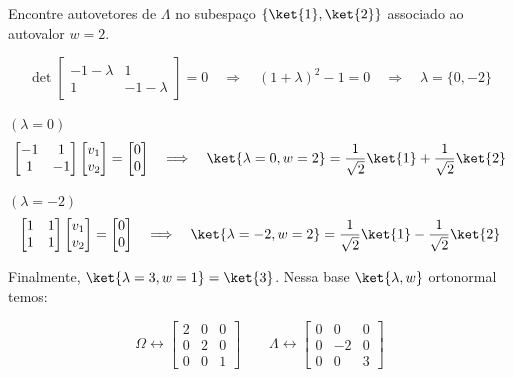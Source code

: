 Encontre autovetores de $\Lambda$ no subespaço $\{\ket{1}, \ket{2}\}$ associado ao autovalor $w=2$.

\begin{equation}
    \det \begin{bmatrix} -1-\lambda & 1 \\ 1 & -1-\lambda \end{bmatrix} = 0
    \quad \Longrightarrow \quad
    (1+\lambda)^2 - 1 = 0
    \quad \Longrightarrow \quad
    \lambda = \{0, -2\}
\end{equation}

$(\lambda = 0)$
\begin{equation}
    \begin{bmatrix} -1 & 1 \\ 1 & -1 \end{bmatrix}
    \begin{bmatrix} v_1 \\ v_2 \end{bmatrix}
    =
    \begin{bmatrix} 0 \\ 0 \end{bmatrix}
    \quad \Longrightarrow \quad
    \ket{\lambda=0, w=2} = \frac{1}{\sqrt{2}}\ket{1} + \frac{1}{\sqrt{2}}\ket{2}
\end{equation}

$(\lambda = -2)$
\begin{equation}
    \begin{bmatrix} 1 & 1 \\ 1 & 1 \end{bmatrix}
    \begin{bmatrix} v_1 \\ v_2 \end{bmatrix}
    =
    \begin{bmatrix} 0 \\ 0 \end{bmatrix}
    \quad \Longrightarrow \quad
    \ket{\lambda=-2, w=2} = \frac{1}{\sqrt{2}}\ket{1} - \frac{1}{\sqrt{2}}\ket{2}
\end{equation}

Finalmente, $\ket{\lambda=3, w=1} = \ket{3}$. Nessa base $\ket{\lambda, w}$ ortonormal temos:

\begin{equation}
    \Omega \leftrightarrow \begin{bmatrix} 2 & 0 & 0 \\ 0 & 2 & 0 \\ 0 & 0 & 1 \end{bmatrix}
    \qquad
    \Lambda \leftrightarrow \begin{bmatrix} 0 & 0 & 0 \\ 0 & -2 & 0 \\ 0 & 0 & 3 \end{bmatrix}
\end{equation}

